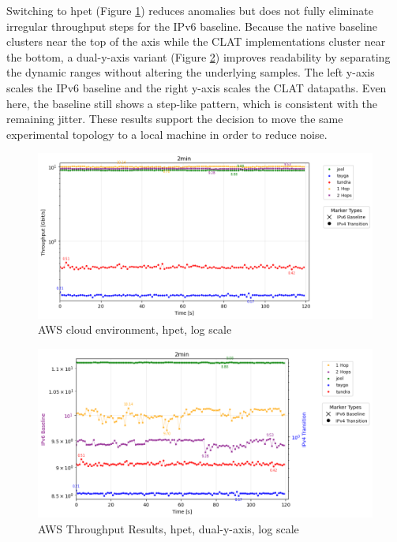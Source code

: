 Switching to hpet (Figure \ref{fig:AWS_tcp_sameScale_hpet_log}) reduces anomalies but does not fully eliminate irregular throughput steps for the IPv6 baseline. Because the native baseline clusters near the top of the axis while the CLAT implementations cluster near the bottom, a dual-y-axis variant (Figure \ref{fig:AWS_tcp_dualAxis_hpet_log}) improves readability by separating the dynamic ranges without altering the underlying samples. The left y-axis scales the IPv6 baseline and the right y-axis scales the CLAT datapaths. Even here, the baseline still shows a step-like pattern, which is consistent with the remaining jitter. These results support the decision to move the same experimental topology to a local machine in order to reduce noise.


\begin{figure}[H]
    \centering
    \includegraphics[width=1\textwidth]{resources/finalPlots/combinedplots/AWS_tcp_sameScale_hpet_2min_log.png}
    \caption{AWS cloud environment, hpet, log scale}
    \label{fig:AWS_tcp_sameScale_hpet_log}

\end{figure}


\begin{figure}[H]
    \centering
    \includegraphics[width=1\textwidth]{resources/finalPlots/Jitterplots/AWS_tcp_dualAxis_hpet_2min_log.png}
    \caption{AWS Throughput Results, hpet, dual-y-axis, log scale}
    \label{fig:AWS_tcp_dualAxis_hpet_log}
\end{figure}



